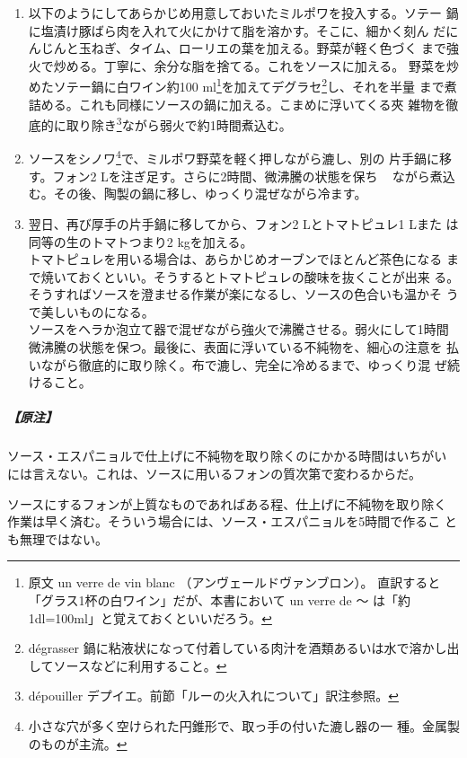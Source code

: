 \begin{recette}
\begin{enumerate}
  弱火にして\footnote{原文から直訳すると「鍋を火の脇に置く」だが、現代の調理環境
    では単純に「弱火にする」と解釈していい。}微沸騰の状態を保つ。
\item
  以下のようにしてあらかじめ用意しておいたミルポワを投入する。ソテー
  鍋に塩漬け豚ばら肉を入れて火にかけて脂を溶かす。そこに、細かく刻ん
  だにんじんと玉ねぎ、タイム、ローリエの葉を加える。野菜が軽く色づく
  まで強火で炒める。丁寧に、余分な脂を捨てる。これをソースに加える。
  野菜を炒めたソテー鍋に白ワイン約100 ml\footnote{原文 un verre de vin
    blanc （アンヴェールドヴァンブロン）。
    直訳すると「グラス1杯の白ワイン」だが、本書において un verre de 〜
    は「約1dl=100ml」と覚えておくといいだろう。}を加えてデグラセ\footnote{dégrasser
    鍋に粘液状になって付着している肉汁を酒類あるいは水で溶かし出してソースなどに利用すること。}し、それを半量
  まで煮詰める。これも同様にソースの鍋に加える。こまめに浮いてくる夾
  雑物を徹底的に取り除き\footnote{dépouiller
    デプイエ。前節「ルーの火入れについて」訳注参照。}ながら弱火で約1時間煮込む。
\item
  ソースをシノワ\footnote{小さな穴が多く空けられた円錐形で、取っ手の付いた漉し器の一
    種。金属製のものが主流。}で、ミルポワ野菜を軽く押しながら漉し、別の
  片手鍋に移す。フォン2 Lを注ぎ足す。さらに2時間、微沸騰の状態を保ち ~
  ながら煮込む。その後、陶製の鍋に移し、ゆっくり混ぜながら冷ます。
\item
  翌日、再び厚手の片手鍋に移してから、フォン2 Lとトマトピュレ1 Lまた
  は同等の生のトマトつまり2 kgを加える。\\
  トマトピュレを用いる場合は、あらかじめオーブンでほとんど茶色になる
  まで焼いておくといい。そうするとトマトピュレの酸味を抜くことが出来
  る。\\
  そうすればソースを澄ませる作業が楽になるし、ソースの色合いも温かそ
  うで美しいものになる。\\
  ソースをヘラか泡立て器で混ぜながら強火で沸騰させる。弱火にして1時間
  微沸騰の状態を保つ。最後に、表面に浮いている不純物を、細心の注意を
  払いながら徹底的に取り除く。布で漉し、完全に冷めるまで、ゆっくり混
  ぜ続けること。
\end{enumerate}

\hypertarget{nota-sauce-espagnole}{%
\subparagraph{【原注】}\label{nota-sauce-espagnole}}

ソース・エスパニョルで仕上げに不純物を取り除くのにかかる時間はいちがい
には言えない。これは、ソースに用いるフォンの質次第で変わるからだ。

ソースにするフォンが上質なものであればある程、仕上げに不純物を取り除く
作業は早く済む。そういう場合には、ソース・エスパニョルを5時間で作るこ
とも無理ではない。


\end{recette}
